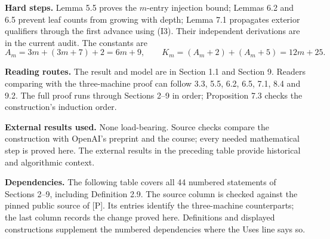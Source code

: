 \documentclass[11pt,a4paper]{article}
\theoremstyle{plain}
\theoremstyle{definition}
\begin{document}
\noindent\textbf{Hard steps.} Lemma 5.5 proves the $m$-entry injection bound; Lemmas 6.2 and 6.5 prevent leaf counts from growing with depth; Lemma 7.1 propagates exterior qualifiers through the first advance using (I3). Their independent derivations are in the current audit. The constants are
\[
 A_m=3m+(3m+7)+2=6m+9,\qquad
 K_m=(A_m+2)+(A_m+5)=12m+25.
\]

\noindent\textbf{Reading routes.} The result and model are in Section 1.1 and Section 9. Readers comparing with the three-machine proof can follow 3.3, 5.5, 6.2, 6.5, 7.1, 8.4 and 9.2. The full proof runs through Sections 2--9 in order; Proposition 7.3 checks the construction's induction order.

\noindent\textbf{External results used.} None load-bearing. Source checks compare the construction with OpenAI's preprint and the course; every needed mathematical step is proved here. The external results in the preceding table provide historical and algorithmic context.

\noindent\textbf{Dependencies.} The following table covers all 44 numbered statements of Sections 2--9, including Definition 2.9. The source column is checked against the pinned public source of [P]. Its entries identify the three-machine counterparts; the last column records the change proved here. Definitions and displayed constructions supplement the numbered dependencies where the Uses line says so.
\end{document}
